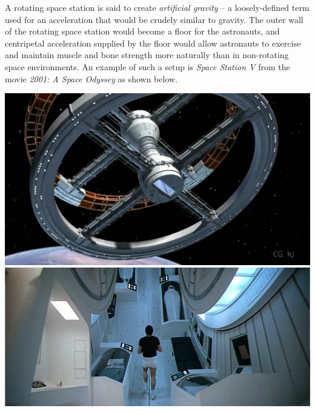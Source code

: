 \documentclass[letterpaper,addpoints,answers]{exam}
\begin{document}
\begin{questions}
\begin{question}
A rotating space station is said to create \emph{artificial gravity} -- a loosely-defined term used for an acceleration that would be crudely similar to gravity. The outer wall of the rotating space station would become a floor for the astronauts, and centripetal acceleration supplied by the floor would allow astronauts to exercise and maintain muscle and bone strength more naturally than in non-rotating space environments. An example of such a setup is \emph{Space Station V} from the movie \emph{2001: A Space Odyssey} as shown below.
\begin{center}
\includegraphics[height=0.16\textheight]{test2/2001-space-station-V} \includegraphics[height=0.16\textheight]{test2/2001-discovery-interior}
\end{center}
\end{question}
\end{questions}
\end{document}
